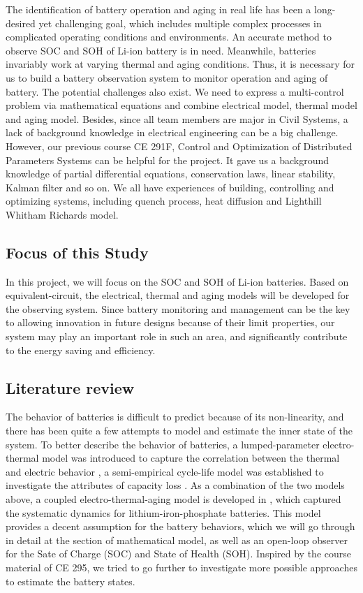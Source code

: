 \documentclass[12pt]{article}
\begin{document}
The identification of battery operation and aging in real life has been a long-desired yet challenging goal, which includes multiple complex processes in complicated operating conditions and environments. An accurate method to observe SOC and SOH of Li-ion battery is in need. Meanwhile, batteries invariably work at varying thermal and aging conditions. Thus, it is necessary for us to build a battery observation system to monitor operation and aging of battery. The potential challenges also exist. We need to express a multi-control problem via mathematical equations and combine electrical model, thermal model and aging model. Besides, since all team members are major in Civil Systems, a lack of background knowledge in electrical engineering can be a big challenge. However, our previous course CE 291F, Control and Optimization of Distributed Parameters Systems can be helpful for the project. It gave us a background knowledge of partial differential equations, conservation laws, linear stability, Kalman filter and so on. We all have experiences of building, controlling and optimizing systems, including quench process,  heat diffusion and Lighthill Whitham Richards model.

\subsection*{Focus of this Study} 

In this project, we will focus on the SOC and SOH of Li-ion batteries. Based on equivalent-circuit, the electrical, thermal and aging models will be developed for the observing system. Since battery monitoring and management can be the key to allowing innovation in future designs because of their limit properties, our system may play an important role in such an area, and significantly contribute to the energy saving and efficiency.

\subsection*{Literature review} 

The behavior of batteries is difficult to predict because of its non-linearity, and there has been quite a few attempts to model and estimate the inner state of the system. To better describe the behavior of batteries, a lumped-parameter electro-thermal model was introduced to capture the correlation between the thermal and electric behavior \cite{ref:4}, a semi-empirical cycle-life model was established to investigate the attributes of capacity loss \cite{ref:3}. As a combination of the two models above, a coupled electro-thermal-aging model is developed in \cite{ref:1}, which captured the systematic dynamics for lithium-iron-phosphate batteries. This model provides a decent assumption for the battery behaviors, which we will go through in detail at the section of mathematical model, as well as an open-loop observer for the Sate of Charge (SOC) and State of Health (SOH). Inspired by the course material of CE 295, we tried to go further to investigate more possible approaches to estimate the battery states.
\end{document}
